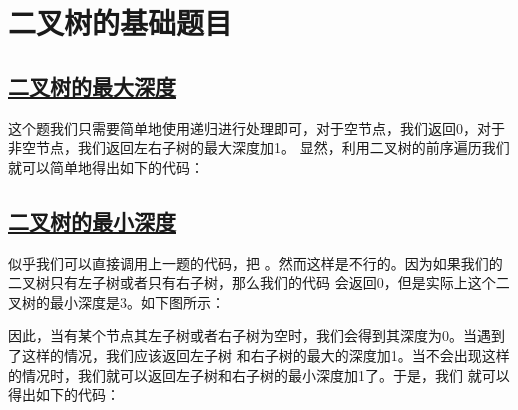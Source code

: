 \documentclass[../../main.tex]{subfiles}
\begin{document}


\section{二叉树的基础题目}

\subsection{\href{https://leetcode.cn/problems/maximum-depth-of-binary-tree/}{二叉树的最大深度}}

这个题我们只需要简单地使用递归进行处理即可，对于空节点，我们返回0，对于非空节点，我们返回左右子树的最大深度加1。
显然，利用二叉树的前序遍历我们就可以简单地得出如下的代码：



\subsection{\href{https://leetcode-cn.com/problems/minimum-depth-of-binary-tree/}{二叉树的最小深度}}

似乎我们可以直接调用上一题的代码，把 。然而这样是不行的。因为如果我们的二叉树只有左子树或者只有右子树，那么我们的代码
会返回0，但是实际上这个二叉树的最小深度是3。如下图所示：


因此，当有某个节点其左子树或者右子树为空时，我们会得到其深度为0。当遇到了这样的情况，我们应该返回左子树
和右子树的最大的深度加1。当不会出现这样的情况时，我们就可以返回左子树和右子树的最小深度加1了。于是，我们
就可以得出如下的代码：


\end{document}
